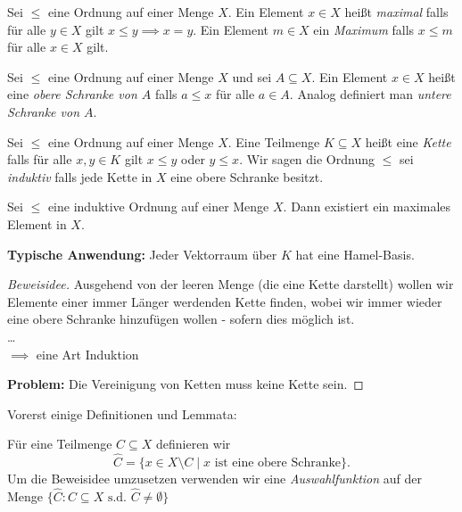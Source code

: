 \begin{definition}
	Sei $\leq$ eine Ordnung auf einer Menge $X$. Ein Element $x \in X$ heißt \emph{maximal} falls für alle $y \in X$ gilt $x \leq y \implies x = y$.
	Ein Element $m \in X$ ein \emph{Maximum} falls $x \leq m$ für alle $x \in X$ gilt.
\end{definition}

\begin{definition}
	Sei $\leq$ eine Ordnung auf einer Menge $X$ und sei $A \subseteq X$.
	Ein Element $x \in X$ heißt eine \emph{obere Schranke von $A$} falls $a \leq x$ für alle $a \in A$.
	Analog definiert man \emph{untere Schranke von $A$}.
\end{definition}

\begin{definition}
	Sei $\leq$ eine Ordnung auf einer Menge $X$. Eine Teilmenge $K \subseteq X$ heißt eine \emph{Kette} falls für alle $x,y \in K$ gilt
	$x \leq y$ oder $y \leq x$. Wir sagen die Ordnung $\leq$ sei \emph{induktiv} falls jede Kette in $X$ eine obere Schranke besitzt.
\end{definition}

\begin{theorem}
	Sei $\leq$ eine induktive Ordnung auf einer Menge $X$.
	Dann existiert ein maximales Element in $X$.
\end{theorem}

\textbf{Typische Anwendung:}
Jeder Vektorraum über $K$ hat eine Hamel-Basis.

\begin{proof}[Beweisidee]
	Ausgehend von der leeren Menge (die eine Kette darstellt) wollen wir
	Elemente einer immer Länger werdenden Kette finden, wobei wir immer wieder eine obere Schranke hinzufügen wollen - sofern dies möglich ist.\\
	\ldots\\
	$\implies$ eine Art Induktion

	\textbf{Problem:} Die Vereinigung von Ketten muss keine Kette sein.
\end{proof}

Vorerst einige Definitionen und Lemmata:
\begin{definition}
	Für eine Teilmenge $C \subseteq X$ definieren wir
	\[
	\widehat{C} = \{x \in X \setminus C \mid x \text{ ist eine obere Schranke}\} 
	.\] 
	Um die Beweisidee umzusetzen verwenden wir eine \emph{Auswahlfunktion} auf der Menge $\{\widehat{C} : C \subseteq X \text{ s.d. } \hat{C} \neq \emptyset\}$
\end{definition}

